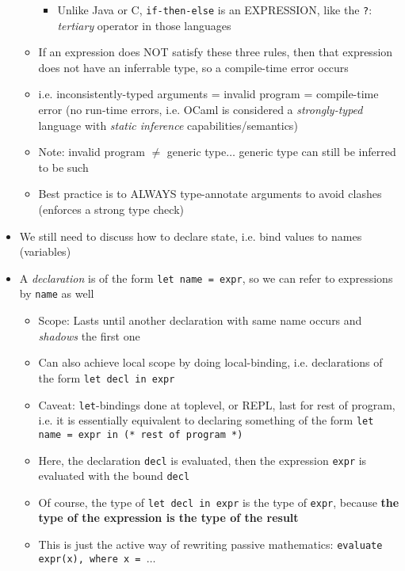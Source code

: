 \begin{itemize}
\begin{itemize}
\begin{itemize}
            \item Unlike \textsf{Java} or \textsf{C}, \texttt{if-then-else} is an EXPRESSION, like the \texttt{?$\colon$} \textit{tertiary} operator in those languages
        \end{itemize}
        \item If an expression does NOT satisfy these three rules, then that expression does not have an inferrable type, so a compile-time error occurs
        \item i.e. inconsistently-typed arguments = invalid program = compile-time error (no run-time errors, i.e. \textsf{OCaml} is considered a \textit{strongly-typed} language with \textit{static inference} capabilities/semantics)
        \item Note: invalid program $\neq$ generic type$\ldots$ generic type can still be inferred to be such
        \item Best practice is to ALWAYS type-annotate arguments to avoid clashes (enforces a strong type check)
    \end{itemize}
    \item We still need to discuss how to declare state, i.e. bind values to names (variables)
    \item A \textit{declaration} is of the form \lstinline{let name = expr}, so we can refer to expressions by \texttt{name} as well
    \begin{itemize}
        \item Scope: Lasts until another declaration with same name occurs and \textit{shadows} the first one
        \item Can also achieve local scope by doing local-binding, i.e. declarations of the form \lstinline{let decl in expr}
        \item Caveat: \lstinline{let}-bindings done at toplevel, or REPL, last for rest of program, i.e. it is essentially equivalent to declaring something of the form \lstinline{let name = expr in (* rest of program *)}
        \item Here, the declaration \texttt{decl} is evaluated, then the expression \texttt{expr} is evaluated with the bound \texttt{decl}
        \item Of course, the type of \lstinline{let decl in expr} is the type of \texttt{expr}, because \textbf{the type of the expression is the type of the result}
        \item This is just the active way of rewriting passive mathematics: \texttt{evaluate expr(x), where x = $\ldots$}
    \end{itemize}

\end{itemize}
